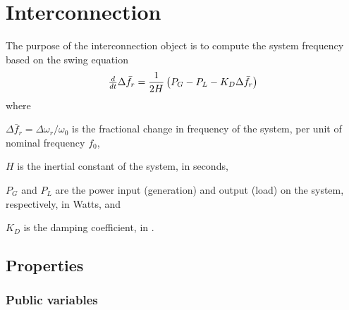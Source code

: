 \chapter{Interconnection}

The purpose of the interconnection object is to compute the system frequency based on the swing equation \cite{kundur1994}
\begin{equation} \label{eq:swing}
	\tfrac{d}{dt} \Delta \bar f_r = \frac{1}{2H} \left( P_G - P_L - K_D \Delta \bar f_r \right)
\end{equation}
where 

\begin{description}

\item $\Delta \bar f_r = \Delta \omega_r / \omega_0$ is the fractional change in frequency of the system, per unit of nominal frequency $f_0$,

\item $H$ is the inertial constant of the system, in seconds, 

\item $P_G$ and $P_L$ are the power input (generation) and output (load) on the system, respectively, in Watts, and 

\item $K_D$ is the damping coefficient, in .

\end{description}

\section{Properties}

\subsection{Public variables}

